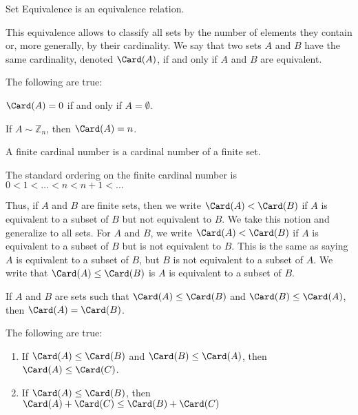 \documentclass[crop=false,class=article,oneside]{standalone}
\begin{document}
        \begin{theorem*}
            Set Equivalence is an equivalence relation.
        \end{theorem*}
        This equivalence allows to classify all sets by the
        number of elements they contain or, more generally,
        by their cardinality. We say that two sets $A$ and
        $B$ have the same cardinality, denoted
        $\Card(A)$, if and only if $A$ and $B$ are equivalent.
        \begin{theorem*}
            The following are true:
            \begin{enumerate}
                \begin{multicols}{2}
                    \item $\Card(A)=0$ if and only if
                          $A=\emptyset$.
                    \item If ${A}\sim{\mathbb{Z}_{n}}$, then
                          $\Card(A)=n$.
                \end{multicols}
            \end{enumerate}
        \end{theorem*}
        \begin{definition}
            A finite cardinal number is a cardinal
            number of a finite set.
        \end{definition}
        \begin{definition}
            The standard ordering on the finite cardinal
            number is $0<1<\hdots<n<n+1<\hdots$
        \end{definition}
        Thus, if $A$ and $B$ are finite sets, then we write
        $\Card(A)<\Card(B)$ if $A$ is equivalent to a
        subset of $B$ but not equivalent to $B$.
        We take this notion and generalize to
        all sets. For $A$ and $B$, we write
        $\Card(A)<\Card(B)$ if $A$ is equivalent to a subset
        of $B$ but is not equivalent to $B$. This is the
        same as saying $A$ is equivalent to a subset of $B$,
        but $B$ is not equivalent to a subset of $A$.
        We write that
        $\Card(A)\leq\Card(B)$ is $A$ is equivalent to a
        subset of $B$.
        \begin{theorem*}
            If $A$ and $B$ are sets such that
            $\Card(A)\leq\Card(B)$ and
            $\Card(B)\leq\Card(A)$, then
            $\Card(A)=\Card(B)$.
        \end{theorem*}
        \begin{theorem*}
            The following are true:
            \begin{enumerate}
                \item If $\Card(A)\leq\Card(B)$ and
                      $\Card(B)\leq\Card(A)$, then
                      $\Card(A)\leq\Card(C)$.
                \item If $\Card(A)\leq\Card(B)$, then
                      $\Card(A)+\Card(C)\leq\Card(B)+\Card(C)$
            \end{enumerate}
        \end{theorem*}
\end{document}
